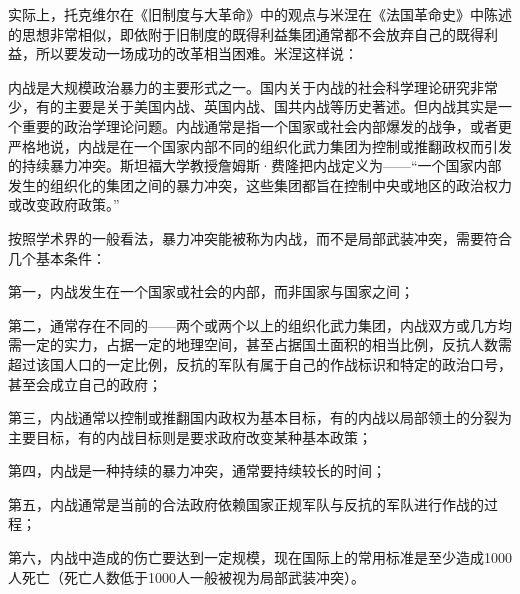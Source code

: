 实际上，托克维尔在《旧制度与大革命》中的观点与米涅在《法国革命史》中陈述的思想非常相似，即依附于旧制度的既得利益集团通常都不会放弃自己的既得利益，所以要发动一场成功的改革相当困难。米涅这样说：



内战是大规模政治暴力的主要形式之一。国内关于内战的社会科学理论研究非常少，有的主要是关于美国内战、英国内战、国共内战等历史著述。但内战其实是一个重要的政治学理论问题。内战通常是指一个国家或社会内部爆发的战争，或者更严格地说，内战是在一个国家内部不同的组织化武力集团为控制或推翻政权而引发的持续暴力冲突。斯坦福大学教授詹姆斯·费隆把内战定义为——“一个国家内部发生的组织化的集团之间的暴力冲突，这些集团都旨在控制中央或地区的政治权力或改变政府政策。”

按照学术界的一般看法，暴力冲突能被称为内战，而不是局部武装冲突，需要符合几个基本条件：

第一，内战发生在一个国家或社会的内部，而非国家与国家之间；

第二，通常存在不同的——两个或两个以上的组织化武力集团，内战双方或几方均需一定的实力，占据一定的地理空间，甚至占据国土面积的相当比例，反抗人数需超过该国人口的一定比例，反抗的军队有属于自己的作战标识和特定的政治口号，甚至会成立自己的政府；

第三，内战通常以控制或推翻国内政权为基本目标，有的内战以局部领土的分裂为主要目标，有的内战目标则是要求政府改变某种基本政策；

第四，内战是一种持续的暴力冲突，通常要持续较长的时间；

第五，内战通常是当前的合法政府依赖国家正规军队与反抗的军队进行作战的过程；

第六，内战中造成的伤亡要达到一定规模，现在国际上的常用标准是至少造成1000人死亡（死亡人数低于1000人一般被视为局部武装冲突）。

